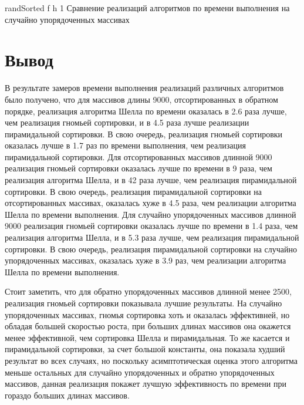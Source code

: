 {randSorted} %
{f} %
{h} %
{1\textwidth} %
{Сравнение реализаций алгоритмов по времени выполнения на случайно упорядоченных массивах} %

\clearpage

\section*{Вывод}

В результате замеров времени выполнения реализаций различных алгоритмов было получено, что для массивов длины 9000, отсортированных в обратном порядке, реализация алгоритма Шелла по времени оказалась в 2.6 раза лучше, чем реализация гномьей сортировки, и в 4.5 раза лучше реализации пирамидальной сортировки.
В свою очередь, реализация гномьей сортировки оказалась лучше в 1.7 раз по времени выполнения, чем реализация пирамидальной сортировки.
Для отсортированных массивов длинной 9000 реализация гномьей сортировки оказалась лучше по времени в 9 раза, чем реализация алгоритма Шелла, и в 42 раза лучше, чем реализация пирамидальной сортировки. 
В свою очередь, реализация пирамидальной сортировки на отсортированных массивах, оказалась хуже в 4.5 раза, чем реализации алгоритма Шелла по времени выполнения.
Для случайно упорядоченных массивов длинной 9000 реализация гномьей сортировки оказалась лучше по времени в 1.4 раза, чем реализация алгоритма Шелла, и в 5.3 раза лучше, чем реализация пирамидальной сортировки. 
В свою очередь, реализация пирамидальной сортировки на случайно упорядоченных массивах, оказалась хуже в 3.9 раз, чем реализации алгоритма Шелла по времени выполнения.

Стоит заметить, что для обратно упорядоченных массивов длинной менее 2500, реализация гномьей сортировки показывала лучшие результаты. 
На случайно упорядоченных массивах, гномья сортировка хоть и оказалась эффективней, но обладая большей скоростью роста, при больших длинах массивов она окажется менее эффективной, чем сортировка Шелла и пирамидальная. 
То же касается и пирамидальной сортировки, за счет большой константы, она показала худший результат во всех случаях, но поскольку асимптотическая оценка этого алгоритма меньше остальных для случайно упорядоченных и обратно упорядоченных массивов, данная реализация покажет лучшую эффективность по времени при гораздо больших длинах массивов.